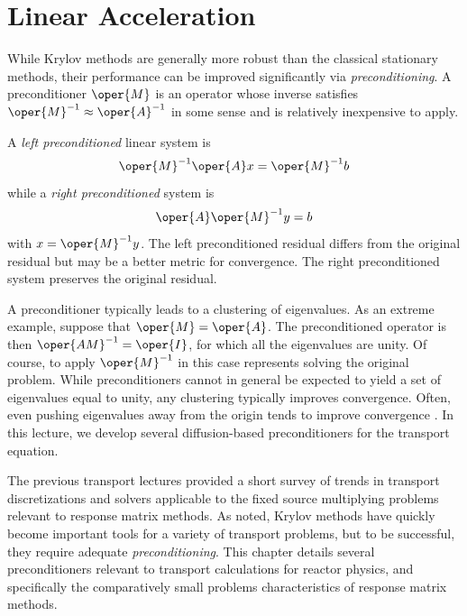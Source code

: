 \chapter{Linear Acceleration}
\label{lec:linear_acceleration}


While Krylov methods are generally more robust than the classical 
stationary methods, their performance can be improved significantly
via \emph{ preconditioning}.  A preconditioner $\oper{M}$ is an operator 
whose inverse satisfies $\oper{M}^{-1} \approx \oper{A}^{-1}$ in some sense 
and is relatively inexpensive to apply.

A \emph{ left preconditioned} linear system is
\begin{equation}
  \oper{M}^{-1}\oper{A}x = \oper{M}^{-1}b
\end{equation}
while a \emph{ right preconditioned} system is 
\begin{equation}
  \oper{A}\oper{M}^{-1} y = b
\end{equation}
with $x = \oper{M}^{-1} y$.  The left preconditioned residual differs 
from the original residual but may be a better metric for convergence. 
The right preconditioned system preserves the original residual.  

A preconditioner typically leads to a clustering of eigenvalues.  As 
an extreme example, suppose that $\oper{M} = \oper{A}$.  The 
preconditioned operator is then $\oper{AM}^{-1} = \oper{I}$, for 
which all the eigenvalues are unity.  Of course, to apply $\oper{M}^{-1}$ 
in this case represents solving the original problem.  While preconditioners
cannot in general be expected to yield a set of eigenvalues equal to unity, 
any clustering typically improves convergence.  Often, even pushing 
eigenvalues away from the origin tends to improve 
convergence \cite{larsen2010ado}.  In this lecture, we develop several
diffusion-based preconditioners for the transport equation.



The previous transport lectures provided a short survey of trends in
transport discretizations and solvers applicable to the fixed source 
multiplying problems relevant to response matrix methods.  As noted, 
Krylov methods have quickly become important tools for a variety of 
transport problems, but to be successful, they require adequate 
\emph{ preconditioning}.  
This chapter details several preconditioners 
relevant to transport calculations for reactor physics, and specifically 
the comparatively small problems characteristics of response matrix 
methods.

